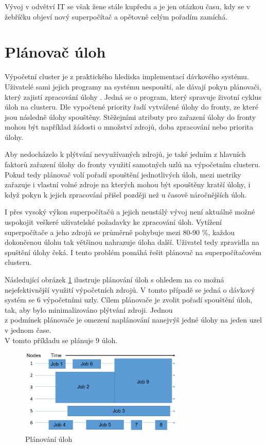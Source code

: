 Vývoj v odvětví IT se však žene stále kupředu a je jen otázkou času, kdy se v žebříčku objeví nový superpočítač a opětovně celým pořadím zamíchá.

\section{Plánovač úloh}
Výpočetní cluster je z praktického hlediska implementací dávkového systému. Uživatelé sami jejich programy na systému nespouští, ale dávají pokyn plánovači, který zajistí zpracování úlohy \cite{W94NKRaxvG2L2A1W}. Jedná se o program, který spravuje životní cyklus úloh na clusteru. Dle vypočtené priority řadí vytvářené úlohy do fronty, ze které jsou následně úlohy spouštěny. Stěžejními atributy pro zařazení úlohy do fronty mohou být například žádosti o množství zdrojů, doba zpracování nebo priorita úlohy.

Aby nedocházelo k plýtvání nevyužívaných zdrojů, je také jedním z hlavních faktorů zařazení úlohy do fronty využití samotných uzlů na výpočetním clusteru. Pokud tedy plánovač volí pořadí spouštění jednotlivých úloh, mezi metriky zařazuje i vlastní volné zdroje na kterých mohou být spouštěny kratší úlohy, i když pokyn k jejich zpracování přišel později než u časově náročnějších úloh.

I přes vysoký výkon superpočítačů a jejich neustálý vývoj není aktuálně možné uspokojit veškeré uživatelské požadavky ke zpracování úloh. Vytížení superpočítače a jeho zdrojů se průměrně pohybuje mezi 80-90 \%, každou dokončenou úlohu tak většinou nahrazuje úloha další. Uživatel tedy zpravidla na spuštění úlohy čeká. I tento problém pomáhá řešit plánovač na superpočítačovém clusteru. 

Následující obrázek \ref{fig:planovani-uloh} ilustruje plánování úloh s ohledem na co možná nejefektivnější využití výpočetních zdrojů. V tomto případě se jedná o dávkový systém se 6 výpočetními uzly. Cílem plánovače je zvolit pořadí spouštění úloh, tak, aby bylo minimalizováno plýtvání zdroji. Jednou \\z podmínek plánovače je omezení naplánování nanejvýš jedné úlohy na jeden uzel v jednom čase. \\V tomto příkladu se plánuje 9 úloh.

\begin{figure}[h]
	\centering
	\includegraphics[width=0.7\textwidth]{Figures/Scheduler.png}
	\caption{Plánování úloh \cite{W94NKRaxvG2L2A1W}}
	\label{fig:planovani-uloh}
\end{figure}

